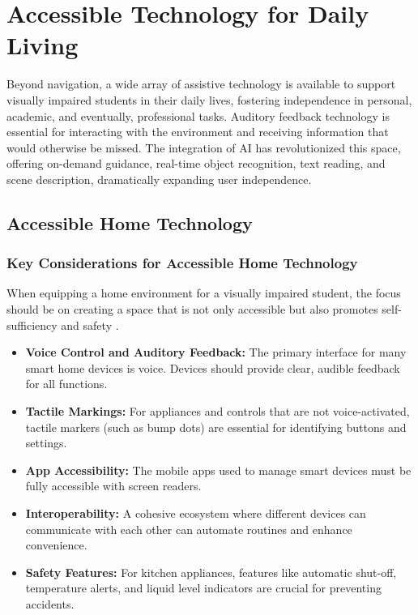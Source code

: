 \section{Accessible Technology for Daily Living}\label{ch8:sec:accessible-tech-daily-living}

Beyond navigation, a wide array of assistive technology is available to support visually impaired students in their daily lives, fostering independence in personal, academic, and eventually, professional tasks. Auditory feedback technology is essential for interacting with the environment and receiving information that would otherwise be missed. The integration of AI has revolutionized this space, offering on-demand guidance, real-time object recognition, text reading, and scene description, dramatically expanding user independence.\supercite{aimodels2024, msseeingai, envision}

\subsection{Accessible Home Technology}

\subsubsection{Key Considerations for Accessible Home Technology}
When equipping a home environment for a visually impaired student, the focus should be on creating a space that is not only accessible but also promotes self-sufficiency and safety \supercite{AllAboutVision2023}.

\begin{itemize}
	\item \textbf{Voice Control and Auditory Feedback:} The primary interface for many smart home devices is voice. Devices should provide clear, audible feedback for all functions.
	\item \textbf{Tactile Markings:} For appliances and controls that are not voice-activated, tactile markers (such as bump dots) are essential for identifying buttons and settings.
	\item \textbf{App Accessibility:} The mobile apps used to manage smart devices must be fully accessible with screen readers.
	\item \textbf{Interoperability:} A cohesive ecosystem where different devices can communicate with each other can automate routines and enhance convenience.
	\item \textbf{Safety Features:} For kitchen appliances, features like automatic shut-off, temperature alerts, and liquid level indicators are crucial for preventing accidents.
\end{itemize}

